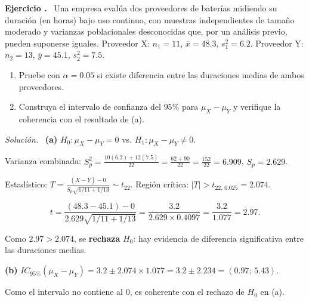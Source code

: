 \documentclass[11pt,a4paper]{article}
\newcounter{ejnum}
\newenvironment{ejercicio}{\refstepcounter{ejnum}\par\medskip\noindent\textbf{Ejercicio \theejnum.}~}{\par}
\newenvironment{solucion}{\par\noindent\textit{Solución.}~}{\par\vspace{1em}}
\begin{document}
\begin{ejercicio}
Una empresa evalúa dos proveedores de baterías midiendo su duración (en horas) bajo uso continuo, con muestras independientes de tamaño moderado y varianzas poblacionales desconocidas que, por un análisis previo, pueden suponerse iguales. Proveedor X: $n_1=11$, $\overline{x}=48.3$, $s_1^2=6.2$. Proveedor Y: $n_2=13$, $\overline{y}=45.1$, $s_2^2=7.5$.
\begin{enumerate}[label=(\alph*)]
\item Pruebe con $\alpha=0.05$ si existe diferencia entre las duraciones medias de ambos proveedores.
\item Construya el intervalo de confianza del $95\%$ para $\mu_X-\mu_Y$ y verifique la coherencia con el resultado de (a).
\end{enumerate}
\end{ejercicio}

\begin{solucion}
\textbf{(a)} $H_0:\mu_X-\mu_Y=0$ vs. $H_1:\mu_X-\mu_Y\neq0$.

Varianza combinada: $\displaystyle S_p^2=\frac{10(6.2)+12(7.5)}{22}=\frac{62+90}{22}=\frac{152}{22}=6.909$, $S_p=2.629$.

Estadístico: $\displaystyle T=\frac{(\overline{X}-\overline{Y})-0}{S_p\sqrt{1/11+1/13}}\sim t_{22}$. Región crítica: $|T|>t_{22,\,0.025}=2.074$.

\[
t=\frac{(48.3-45.1)-0}{2.629\sqrt{1/11+1/13}}=\frac{3.2}{2.629\times0.4097}=\frac{3.2}{1.077}=2.97.
\]

Como $2.97>2.074$, se \textbf{rechaza} $H_0$: hay evidencia de diferencia significativa entre las duraciones medias.

\textbf{(b)} $\displaystyle IC_{95\%}(\mu_X-\mu_Y)=3.2\pm2.074\times1.077=3.2\pm2.234=(0.97;\,5.43)$.

Como el intervalo no contiene al $0$, es coherente con el rechazo de $H_0$ en (a).
\end{solucion}
\end{document}
